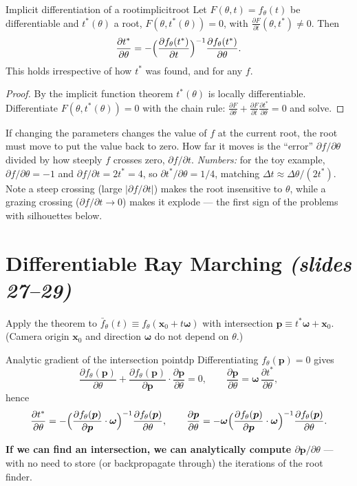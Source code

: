 \documentclass[11pt,a4paper]{article}
\newcommand{\bx}{{\bm{x}}}
\newcommand{\bp}{{\bm{p}}}
\newcommand{\bom}{{\bm{\omega}}}
\newcommand{\pdv}[2]{\frac{\partial #1}{\partial #2}}
\begin{document}
\begin{Theorem}{Implicit differentiation of a root}{implicitroot}
Let $F(\theta,t)=f_\theta(t)$ be differentiable and $t^*(\theta)$ a root, $F(\theta,t^*(\theta))=0$, with
$\pdv{F}{t}(\theta,t^*)\neq0$. Then
\[
\pdv{t^*}{\theta}=-\Bigl(\pdv{f_\theta(t^*)}{t}\Bigr)^{-1}\pdv{f_\theta(t^*)}{\theta}.
\]
This holds irrespective of how $t^*$ was found, and for any $f$.
\end{Theorem}
\begin{proof}
By the implicit function theorem $t^*(\theta)$ is locally differentiable. Differentiate
$F(\theta,t^*(\theta))=0$ with the chain rule: $\pdv{F}{\theta}+\pdv{F}{t}\pdv{t^*}{\theta}=0$ and solve.
\end{proof}
\begin{intuition}
If changing the parameters changes the value of $f$ at the current root, the root must move to put the value back to
zero. How far it moves is the ``error'' $\partial f/\partial\theta$ divided by how steeply $f$ crosses zero,
$\partial f/\partial t$. \emph{Numbers:} for the toy example, $\partial f/\partial\theta=-1$ and $\partial f/\partial t=2t^*=4$,
so $\partial t^*/\partial\theta=1/4$, matching $\Delta t\approx\Delta\theta/(2t^*)$. Note a steep crossing
(large $|\partial f/\partial t|$) makes the root insensitive to $\theta$, while a grazing crossing
($\partial f/\partial t\to0$) makes it explode --- the first sign of the problems with silhouettes below.
\end{intuition}

\section{Differentiable Ray Marching \emph{(slides 27--29)}}
Apply the theorem to $\bar f_\theta(t)\equiv f_\theta(\bx_0+t\bom)$ with intersection $\bp\equiv t^*\bom+\bx_0$.
(Camera origin $\bx_0$ and direction $\bom$ do not depend on $\theta$.)

\begin{Corollary}{Analytic gradient of the intersection point}{dp}
Differentiating $f_\theta(\bp)=0$ gives
\[
\pdv{f_\theta(\bp)}{\theta}+\pdv{f_\theta(\bp)}{\bp}\cdot\pdv{\bp}{\theta}=0,
\qquad \pdv{\bp}{\theta}=\bom\,\pdv{t^*}{\theta},
\]
hence
\[
\pdv{t^*}{\theta}=-\Bigl(\pdv{f_\theta(\bp)}{\bp}\cdot\bom\Bigr)^{-1}\pdv{f_\theta(\bp)}{\theta},
\qquad
\pdv{\bp}{\theta}=-\bom\Bigl(\pdv{f_\theta(\bp)}{\bp}\cdot\bom\Bigr)^{-1}\pdv{f_\theta(\bp)}{\theta}.
\]
\end{Corollary}
\textbf{If we can find an intersection, we can analytically compute $\partial\bp/\partial\theta$} --- with no need to store
(or backpropagate through) the iterations of the root finder.
\end{document}
